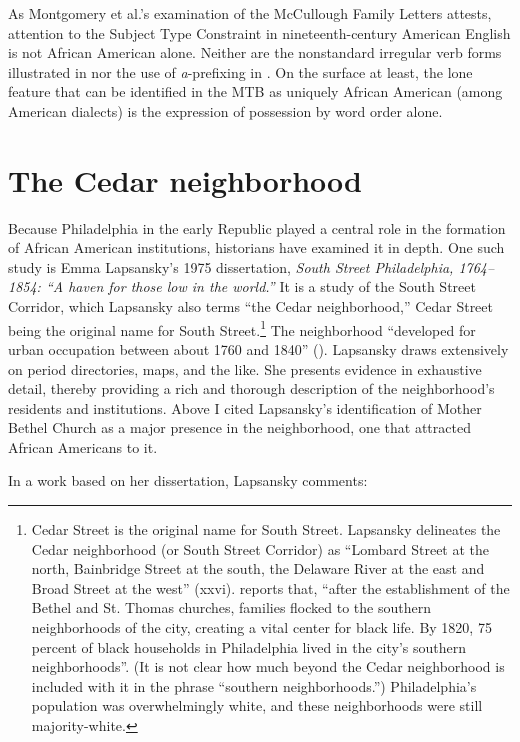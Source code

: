 \documentclass[output=paper,colorlinks,citecolor=brown]{langscibook}
\begin{document}
As Montgomery et al.’s examination of the McCullough Family Letters attests, attention to the Subject Type Constraint in nineteenth-century American English is not African American alone. Neither are the nonstandard irregular verb forms illustrated in  nor the use of \textit{a}{}-prefixing in . On the surface at least, the lone feature that can be identified in the MTB as uniquely African American (among American dialects) is the expression of possession by word order alone.          

\section{The Cedar neighborhood} \label{section4}

Because Philadelphia in the early Republic played a central role in the formation of African American institutions, historians have examined it in depth. One such study is Emma Lapsansky’s 1975 dissertation, \textit{South Street Philadelphia, 1764--1854: “A haven for those low in the world.”} It is a study of the South Street Corridor, which Lapsansky also terms “the Cedar neighborhood,” Cedar Street being the original name for South Street.\footnote{{Cedar Street is the original name for South Street. Lapsansky delineates the Cedar neighborhood (or South Street Corridor) as “Lombard Street at the north, Bainbridge Street at the south, the Delaware River at the east and Broad Street at the west” (xxvi).} {\citet[2]{Dorman2009} reports that, “after the establishment of the Bethel and St. Thomas churches, families flocked to the southern neighborhoods of the city, creating a vital center for black life. By 1820, 75 percent of black households in Philadelphia lived in the city’s southern neighborhoods”. (It is not clear how much beyond the Cedar neighborhood is included with it in the phrase “southern neighborhoods.”) Philadelphia’s population was overwhelmingly white, and these neighborhoods were still majority-white.}} The neighborhood “developed for urban occupation between about 1760 and 1840” (\citealt[xxvi]{Lapsansky1975}). Lapsansky draws extensively on period directories, maps, and the like. She presents evidence in exhaustive detail, thereby providing a rich and thorough description of the neighborhood’s residents and institutions. Above I cited Lapsansky’s identification of Mother Bethel Church as a major presence in the neighborhood, one that attracted African Americans to it.

In a work based on her dissertation, Lapsansky comments:
\end{document}
